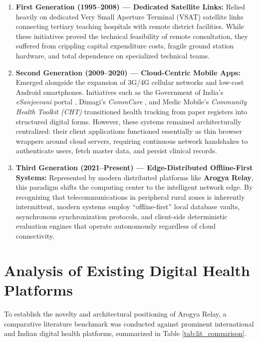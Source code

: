 \documentclass[12pt,a4paper,oneside]{report}
\begin{document}
\begin{enumerate}[label=\textbf{\arabic*.},itemsep=1pt,topsep=1pt,parsep=0pt]
    \item \textbf{First Generation (1995--2008) --- Dedicated Satellite Links:} Relied heavily on dedicated Very Small Aperture Terminal (VSAT) satellite links connecting tertiary teaching hospitals with remote district facilities. While these initiatives proved the technical feasibility of remote consultation, they suffered from crippling capital expenditure costs, fragile ground station hardware, and total dependence on specialized technical teams.
    \item \textbf{Second Generation (2009--2020) --- Cloud-Centric Mobile Apps:} Emerged alongside the expansion of 3G/4G cellular networks and low-cost Android smartphones. Initiatives such as the Government of India's \textit{eSanjeevani} portal \cite{esanjeevani2023}, Dimagi's \textit{CommCare} \cite{commcare2021}, and Medic Mobile's \textit{Community Health Toolkit (CHT)} \cite{medic2022} transitioned health tracking from paper registers into structured digital forms. However, these systems remained architecturally centralized: their client applications functioned essentially as thin browser wrappers around cloud servers, requiring continuous network handshakes to authenticate users, fetch master data, and persist clinical records.
    \item \textbf{Third Generation (2021--Present) --- Edge-Distributed Offline-First Systems:} Represented by modern distributed platforms like \textbf{Arogya Relay}, this paradigm shifts the computing center to the intelligent network edge. By recognizing that telecommunications in peripheral rural zones is inherently intermittent, modern systems employ ``offline-first'' local database vaults, asynchronous synchronization protocols, and client-side deterministic evaluation engines that operate autonomously regardless of cloud connectivity.
\end{enumerate}

\section{Analysis of Existing Digital Health Platforms}
To establish the novelty and architectural positioning of Arogya Relay, a comparative literature benchmark was conducted against prominent international and Indian digital health platforms, summarized in Table \ref{tab:lit_comparison}.
\end{document}
